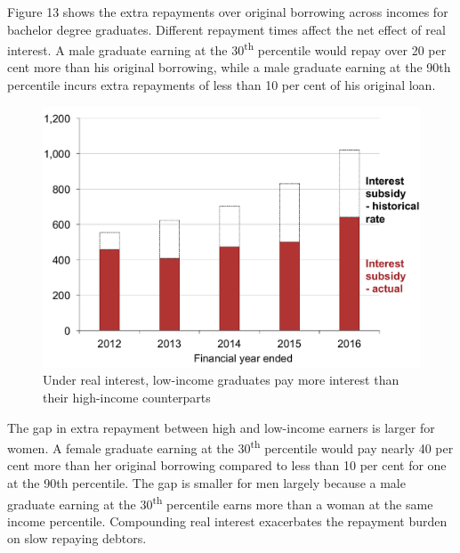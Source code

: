 \documentclass[embargoed]{grattan}
\begin{document}
Figure 13 shows the extra repayments over original borrowing across incomes for bachelor degree graduates.
Different repayment times affect the net effect of real interest.
A male graduate earning at the 30\textsuperscript{th} percentile would repay over 20 per cent more than his original borrowing, while a male graduate earning at the 90th percentile incurs extra repayments of less than 10 per cent of his original loan.

\begin{figure}
\caption{Under real interest, low-income graduates pay more interest than their high-income counterparts}\label{fig:fig13-under-real-interest-low-income-grads-pay-more-interest-than-high-income-counterparts}


\includegraphics[page=13]{atlas/Chartpack.pdf}
\end{figure}

The gap in extra repayment between high and low-income earners is larger for women.
A female graduate earning at the 30\textsuperscript{th} percentile would pay nearly 40 per cent more than her original borrowing compared to less than 10 per cent for one at the 90th percentile.
The gap is smaller for men largely because a male graduate earning at the 30\textsuperscript{th} percentile earns more than a woman at the same income percentile.
Compounding real interest exacerbates the repayment burden on slow repaying debtors.
\end{document}
